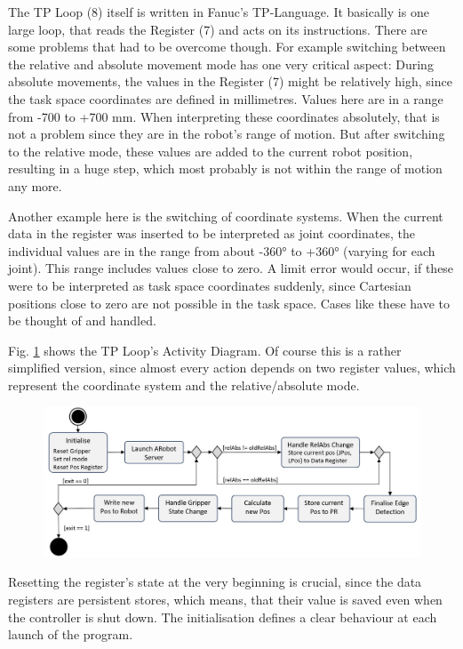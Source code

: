 The TP Loop (8) itself is written in Fanuc's TP-Language. It basically is one large loop, that reads the Register (7) and acts on its instructions. There are some problems that had to be overcome though. For example switching between the relative and absolute movement mode has one very critical aspect: During absolute movements, the values in the Register (7) might be relatively high, since the task space coordinates are defined in millimetres. Values here are in a range from -700 to +700 mm. When interpreting these coordinates absolutely, that is not a problem since they are in the robot's range of motion. But after switching to the relative mode, these values are added to the current robot position, resulting in a huge step, which most probably is not within the range of motion any more.

Another example here is the switching of coordinate systems. When the current data in the register was inserted to be interpreted as joint coordinates, the individual values are in the range from about -360° to +360° (varying for each joint). This range includes values close to zero. A limit error would occur, if these were to be interpreted as task space coordinates suddenly, since Cartesian positions close to zero are not possible in the task space. Cases like these have to be thought of and handled. 

Fig. \ref{Fig:TPLoopFlowChart} shows the TP Loop's Activity Diagram. Of course this is a rather simplified version, since almost every action depends on two register values, which represent the coordinate system and the relative/absolute mode. 

\begin{figure}
	\centering
	\includegraphics[width=0.9\linewidth]{Figures/TPLoopFlowChart.jpg}
	\caption{}
	\label{Fig:TPLoopFlowChart}
\end{figure}

Resetting the register's state at the very beginning is crucial, since the data registers are persistent stores, which means, that their value is saved even when the controller is shut down. The initialisation defines a clear behaviour at each launch of the program.

